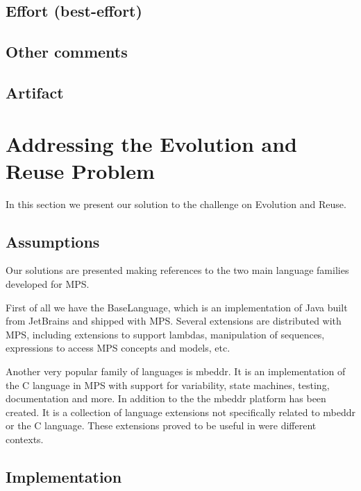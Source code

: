 \documentclass[preprint,numbers,10pt]{sigplanconf}
\begin{document}
\subsection{Effort (best-effort)}

\subsection{Other comments}

\subsection{Artifact}

%
%

\section{Addressing the Evolution and Reuse Problem}

In this section we present our solution to the challenge on Evolution and Reuse.

\subsection{Assumptions}

Our solutions are presented making references to the two main language families developed for MPS.

First of all we have the BaseLanguage, which is an implementation of Java built from JetBrains and shipped with MPS. Several extensions are distributed with MPS, including extensions to support lambdas, manipulation of sequences, expressions to access MPS concepts and models, etc.

Another very popular family of languages is mbeddr. It is an implementation of the C language in MPS with support for variability, state machines, testing, documentation and more. In addition to the the mbeddr platform has been created. It is a collection of language extensions not specifically related to mbeddr or the C language. These extensions proved to be useful in were different contexts.

\subsection{Implementation}
\end{document}
